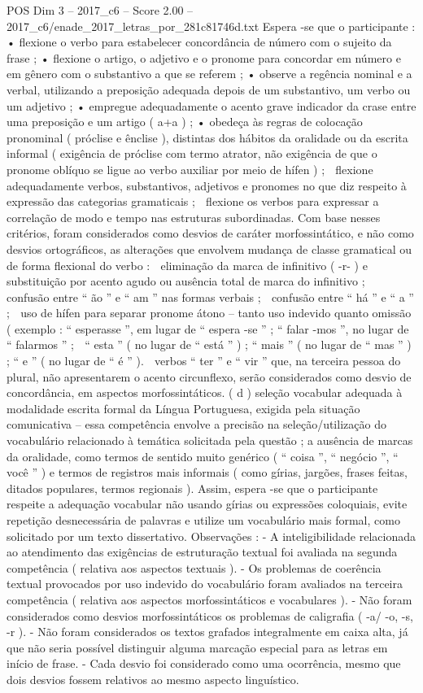 \begin{textsample}{POS Dim 3 – 2017\_c6 – Score 2.00 – 2017\_c6/enade\_2017\_letras\_por\_281c81746d.txt}
Espera -se que o participante : • flexione o verbo para estabelecer concordância de número com o sujeito da frase ; • flexione o artigo, o adjetivo e o pronome para concordar em número e em gênero com o substantivo a que se referem ; • observe a regência nominal e a verbal, utilizando a preposição adequada depois de um substantivo, um verbo ou um adjetivo ; • empregue adequadamente o acento grave indicador da crase entre uma preposição e um artigo ( a+a ) ; • obedeça às regras de colocação pronominal ( próclise e ênclise ), distintas dos hábitos da oralidade ou da escrita informal ( exigência de próclise com termo atrator, não exigência de que o pronome oblíquo se ligue ao verbo auxiliar por meio de hífen ) ;  flexione adequadamente verbos, substantivos, adjetivos e pronomes no que diz respeito à expressão das categorias gramaticais ;  flexione os verbos para expressar a correlação de modo e tempo nas estruturas subordinadas.
Com base nesses critérios, foram considerados como desvios de caráter morfossintático, e não como desvios ortográficos, as alterações que envolvem mudança de classe gramatical ou de forma flexional do verbo :  eliminação da marca de infinitivo ( -r- ) e substituição por acento agudo ou ausência total de marca do infinitivo ;  confusão entre “ ão ” e “ am ” nas formas verbais ;  confusão entre “ há ” e “ a ” ;  uso de hífen para separar pronome átono – tanto uso indevido quanto omissão ( exemplo : “ esperasse ”, em lugar de “ espera -se ” ; “ falar -mos ”, no lugar de “ falarmos ” ;  “ esta ” ( no lugar de “ está ” ) ; “ mais ” ( no lugar de “ mas ” ) ; “ e ” ( no lugar de “ é ” ).  verbos “ ter ” e “ vir ” que, na terceira pessoa do plural, não apresentarem o acento circunflexo, serão considerados como desvio de concordância, em aspectos morfossintáticos. ( d ) seleção vocabular adequada à modalidade escrita formal da Língua Portuguesa, exigida pela situação comunicativa – essa competência envolve a precisão na seleção/utilização do vocabulário relacionado à temática solicitada pela questão ; a ausência de marcas da oralidade, como termos de sentido muito genérico ( “ coisa ”, “ negócio ”, “ você ” ) e termos de registros mais informais ( como gírias, jargões, frases feitas, ditados populares, termos regionais ).
Assim, espera -se que o participante respeite a adequação vocabular não usando gírias ou expressões coloquiais, evite repetição desnecessária de palavras e utilize um vocabulário mais formal, como solicitado por um texto dissertativo.
Observações : - A inteligibilidade relacionada ao atendimento das exigências de estruturação textual foi avaliada na segunda competência ( relativa aos aspectos textuais ). - Os problemas de coerência textual provocados por uso indevido do vocabulário foram avaliados na terceira competência ( relativa aos aspectos morfossintáticos e vocabulares ). - Não foram considerados como desvios morfossintáticos os problemas de caligrafia ( -a/ -o, -s, -r ). - Não foram considerados os textos grafados integralmente em caixa alta, já que não seria possível distinguir alguma marcação especial para as letras em início de frase. - Cada desvio foi considerado como uma ocorrência, mesmo que dois desvios fossem relativos ao mesmo aspecto linguístico.

\end{textsample}
